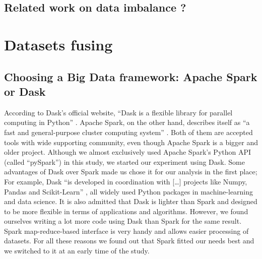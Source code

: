 \documentclass[conference]{IEEEtran}
\begin{document}
\subsection{Related work on data imbalance ?}

\section{Datasets fusing}
\subsection{Choosing a Big Data framework: Apache Spark or Dask}
According to Dask’s official website, “Dask is a flexible library for parallel computing in Python” \cite{dask}. Apache Spark, on the other hand, describes itself as “a fast and general-purpose cluster computing system” \cite{spark}. Both of them are accepted tools with wide supporting community, even though Apache Spark is a bigger and older project. Although we almost exclusively used Apache Spark’s Python API (called “pySpark”) in this study, we started our experiment using Dask. Some advantages of Dask over Spark made us chose it for our analysis in the first place; For example, Dask “is developed in coordination with […] projects like Numpy, Pandas and Scikit-Learn” \cite{dask}, all widely used Python packages in machine-learning and data science. It is also admitted that Dask is lighter than Spark and designed to be more flexible in terms of applications and algorithms. However, we found ourselves writing a lot more code using Dask than Spark for the same result. Spark map-reduce-based interface is very handy and allows easier processing of datasets. For all these reasons we found out that Spark fitted our needs best and we switched to it at an early time of the study.
\end{document}
